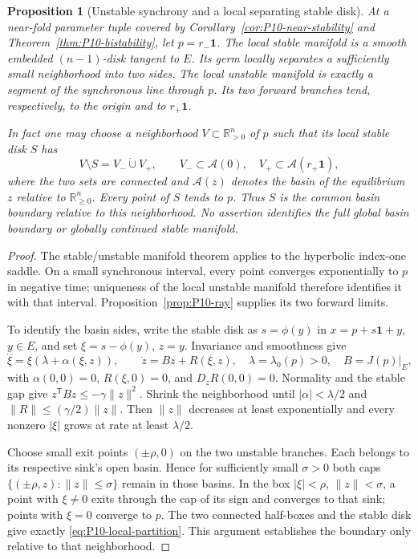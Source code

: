 \documentclass[11pt]{article}
\let\OriginalCite\cite
\renewcommand{\cite}[2][]{%
  \textcolor{CitationRed}{%
    \if\relax\detokenize{#1}\relax
      \OriginalCite{#2}%
    \else
      \OriginalCite[#1]{#2}%
    \fi}}
\newcommand{\R}{\mathbb{R}}
\newcommand{\one}{\mathbf{1}}
\newcommand{\Orth}{\R_{\geq 0}^{n}}
\newcommand{\PosOrth}{\R_{>0}^{n}}
\newtheorem{proposition}[theorem]{Proposition}
\theoremstyle{definition}
\theoremstyle{remark}
\begin{document}
\begin{proposition}[Unstable synchrony and a local separating stable disk]
\label{prop:P10-local-basins}
At a near-fold parameter tuple covered by
Corollary~\ref{cor:P10-near-stability} and
Theorem~\ref{thm:P10-bistability}, let $p=r_-\one$.
The local stable manifold is a smooth embedded $(n-1)$-disk tangent
to $E$. Its germ locally separates a sufficiently small neighborhood
into two sides. The local unstable manifold is exactly a segment of
the synchronous line through $p$. Its two forward branches tend,
respectively, to the origin and to $r_+\one$.

In fact one may choose a neighborhood $V\subset\PosOrth$ of $p$
such that its local stable disk $S$ has
\begin{equation}
 V\setminus S=V_-\mathbin{\dot\cup}V_+,\qquad
 V_-\subset\mathcal A(0),\quad V_+\subset\mathcal A(r_+\one),
 \label{eq:P10-local-partition}
\end{equation}
where the two sets are connected and $\mathcal A(z)$ denotes the
basin of the equilibrium $z$ relative to $\Orth$. Every point of
$S$ tends to $p$. Thus $S$ is the common basin boundary \emph{relative
to this neighborhood}. No assertion identifies the full global basin
boundary or globally continued stable manifold.
\end{proposition}
\begin{proof}
The stable/unstable manifold theorem \cite[Ch.~1]{GuckenheimerHolmes1983}
applies to the hyperbolic index-one saddle. On a small synchronous
interval, every point converges exponentially to $p$ in negative time;
uniqueness of the local unstable manifold therefore identifies it with
that interval. Proposition~\ref{prop:P10-ray} supplies its two forward limits.

To identify the basin sides, write the stable disk as $s=\phi(y)$ in
$x=p+s\one+y$, $y\in E$, and set $\xi=s-\phi(y)$, $z=y$.
Invariance and smoothness give
\begin{equation}
 \dot\xi=\xi(\lambda+\alpha(\xi,z)),\qquad
 \dot z=Bz+R(\xi,z),\quad \lambda=\lambda_0(p)>0,\quad B=J(p)|_E,
 \label{eq:P10-saddle-chart}
\end{equation}
with $\alpha(0,0)=0$, $R(\xi,0)=0$, and $D_zR(0,0)=0$.
Normality and the stable gap give $z^{\mathsf T}Bz\le-\gamma\|z\|^2$.
Shrink the neighborhood until $|\alpha|<\lambda/2$ and
$\|R\|\le(\gamma/2)\|z\|$. Then $\|z\|$ decreases at least
exponentially and every nonzero $|\xi|$ grows at rate at least $\lambda/2$.

Choose small exit points $(\pm\rho,0)$ on the two unstable branches.
Each belongs to its respective sink's open basin. Hence for sufficiently
small $\sigma>0$ both caps $\{(\pm\rho,z):\|z\|\le\sigma\}$
remain in those basins. In the box $|\xi|<\rho$, $\|z\|<\sigma$,
a point with $\xi\ne0$ exits through the cap of its sign and converges
to that sink; points with $\xi=0$ converge to $p$. The two connected
half-boxes and the stable disk give exactly \eqref{eq:P10-local-partition}.
This argument establishes the boundary only relative to that neighborhood.
\end{proof}
\end{document}

